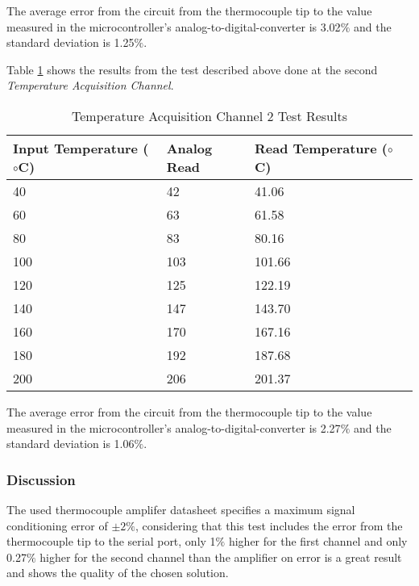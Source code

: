 			The average error from the circuit from the thermocouple tip to the value measured in the microcontroller's analog-to-digital-converter is 3.02$\%$ and the standard deviation is 1.25$\%$. 
			

			Table \ref{table:results-temp2-test} shows the results from the test described above done at the second \textit{Temperature Acquisition Channel}.

				\begin{table}[h!]
					\centering
					\begin{tabular}{|l|l|l|l|}
						\hline
						\textbf{Input Temperature (${\circ}$C)} & \textbf{Analog Read} & \textbf{Read Temperature (${\circ}$C)} \\ \hline
						40 & 42 & 41.06 \\ \hline
						60 & 63 & 61.58 \\ \hline
						80 & 83 & 80.16 \\ \hline
						100 & 103 & 101.66 \\ \hline
						120 & 125 & 122.19 \\ \hline
						140 & 147 & 143.70 \\ \hline
						160 & 170 & 167.16 \\ \hline
						180 & 192 & 187.68 \\ \hline
						200 & 206 & 201.37 \\ \hline
					\end{tabular}
					\caption{Temperature Acquisition Channel 2 Test Results}
					\label{table:results-temp2-test}
				\end{table}

			The average error from the circuit from the thermocouple tip to the value measured in the microcontroller's analog-to-digital-converter is 2.27$\%$ and the standard deviation is 1.06$\%$. 

	\subsubsection{Discussion}

		The used thermocouple amplifer datasheet \cite{ad8495-datasheet} specifies a maximum signal conditioning error of $\pm2\%$, considering that this test includes the error from the thermocouple tip to the serial port, only 1$\%$ higher for the first channel and only 0.27$\%$ higher for the second channel than the amplifier on error is a great result and shows the quality of the chosen solution.
